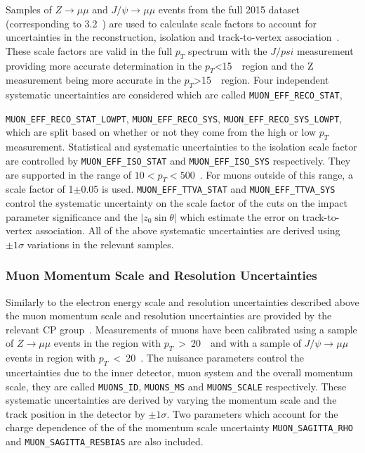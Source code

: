 Samples of $Z \to \mu\mu$ and $J/\psi \to \mu\mu$ events from the full 2015
dataset (corresponding to 3.2~\invfb) are used to calculate scale factors to
account for uncertainties in the reconstruction, isolation and track-to-vertex
association~\cite{muonTWiki}. These scale factors are valid in the full $p_T$
spectrum with the $J/psi$ measurement providing more accurate determination in
the $p_T$<15~\GeV\ region and the Z measurement being more accurate in the
$p_T$>15~\GeV\ region. Four independent systematic uncertainties are considered
which are called \texttt{MUON\_EFF\_RECO\_STAT},

\texttt{MUON\_EFF\_RECO\_STAT\_LOWPT}, \texttt{MUON\_EFF\_RECO\_SYS},
\texttt{MUON\_EFF\_RECO\_SYS\_LOWPT}, which are split based on whether or not
they come from the high or low $p_T$ measurement. Statistical and systematic
uncertainties to the isolation scale factor are controlled by
\texttt{MUON\_EFF\_ISO\_STAT} and \texttt{MUON\_EFF\_ISO\_SYS} respectively.
They are supported in the range of $10 < p_T < 500$~\GeV. For muons outside of
this range, a scale factor of 1$\pm$0.05 is used.
\texttt{MUON\_EFF\_TTVA\_STAT} and \texttt{MUON\_EFF\_TTVA\_SYS} control the
systematic uncertainty on the scale factor of the cuts on the impact parameter
significance and the $|z_0\sin\theta|$ which estimate the error on
track-to-vertex association. All of the above systematic uncertainties are
derived using $\pm 1\sigma$ variations in the relevant samples.

\subsubsection{Muon Momentum Scale and Resolution Uncertainties}

Similarly to the electron energy scale and resolution uncertainties described
above the muon momentum scale and resolution uncertainties are provided by the
relevant CP group~\cite{muonTWiki}. Measurements of muons have been calibrated
using a sample of  $Z\rightarrow \mu\mu$ events in the region with
$p_T$~>~20~\GeV\ and with a sample of $J/\psi\rightarrow \mu\mu$ events in region
with $p_T$~<~20~\GeV. The nuisance parameters control the uncertainties due to
the inner detector, muon system and the overall momentum scale, they are called
\texttt{MUONS\_ID}, \texttt{MUONS\_MS} and \texttt{MUONS\_SCALE} respectively.
These systematic uncertainties are derived by varying the momentum scale and the
track position in the detector by $\pm 1\sigma$. Two parameters which account
for the charge dependence of the of the momentum scale uncertainty
\texttt{MUON\_SAGITTA\_RHO} and \texttt{MUON\_SAGITTA\_RESBIAS} are also included.

